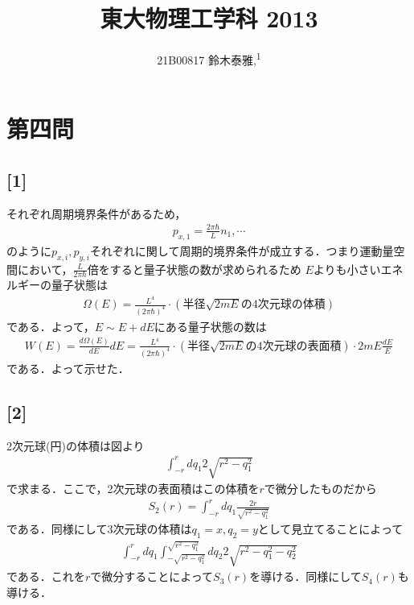 \documentclass[12pt,dvipdfmx]{jsarticle}
\newcommand\authormark[1]{\textsuperscript{#1}}
\begin{document}
\title{東大物理工学科 2013}

\author{21B00817 鈴木泰雅,\authormark{1}}
\section*{\Large{第四問}}
\subsection*{\large{[1]}}
それぞれ周期境界条件があるため，
\begin{eqnarray}
  p_{x,1} = \frac{2\pi\hbar}{L}n_1,\cdots
\end{eqnarray}
のように$p_{x,i},p_{y,i}$それぞれに関して周期的境界条件が成立する．つまり運動量空間において，$\frac{L}{2\pi\hbar}$倍をすると量子状態の数が求められるため
$E$よりも小さいエネルギーの量子状態は
\begin{eqnarray}
  \Omega(E)=\frac{L^{4}}{(2\pi\hbar)^4}\cdot (半径\sqrt{2mE}の4次元球の体積)
\end{eqnarray}
である．よって，$E\sim E+dE$にある量子状態の数は
\begin{eqnarray}
  W(E) = \frac{d\Omega(E)}{dE}dE = \frac{L^{4}}{(2\pi\hbar)^4}\cdot (半径\sqrt{2mE}の4次元球の表面積)\cdot 2mE \frac{dE}{E}
\end{eqnarray}
である．よって示せた．
\subsection*{\large{[2]}}
2次元球(円)の体積は図より
\begin{eqnarray}
  \int_{-r}^{r} dq_1 2\sqrt{r^2-q_1^2}
\end{eqnarray}
で求まる．ここで，2次元球の表面積はこの体積を$r$で微分したものだから
\begin{eqnarray}
  S_2(r) = \int_{-r}^{r} dq_1 \frac{2r}{\sqrt{r^2-q_1^2}}
\end{eqnarray}
である．同様にして3次元球の体積は$q_1=x,q_2=y$として見立てることによって
\begin{eqnarray}
  \int_{-r}^{r}dq_1 \int_{-\sqrt{r^2-q_1^2}}^{\sqrt{r^2-q_1^2}}dq_2 2\sqrt{r^2-q_1^2-q_2^2}
\end{eqnarray}
である．これを$r$で微分することによって$S_3(r)$を導ける．同様にして$S_4(r)$も導ける．
\end{document}
